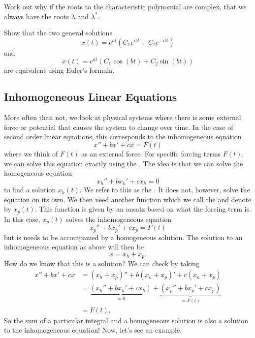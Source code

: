         \begin{exercise}
        Work out why if the roots to the characteristic polynomial are complex, that we always have the roots $\lambda$ and $\lambda^*$.
        \end{exercise}
        
        \begin{exercise}
        Show that the two general solutions
        \[
        x(t)=e^{at}(C_1 e^{ibt}+C_2e^{-ibt})
        \]
        and 
        \[
        x(t)=e^{at}(C_1 \cos(bt)+C_2\sin(bt))
        \]
        are equivalent using Euler's formula.
        \end{exercise}
        
        \subsection{Inhomogeneous Linear Equations}
        
        More often than not, we look at physical systems where there is some external force or potential that causes the system to change over time.  In the case of second order linear equations, this corresponds to the inhomogeneous equation
        \[
        x''+bx'+cx=F(t)
        \]
        where we think of $F(t)$ as an external force.  For specific forcing terms $F(t)$, we can solve this equation exactly using the .  The idea is that we can solve the homogeneous equation
        \[
        x_h''+bx_h'+cx_h=0
        \]
        to find a solution $x_h(t)$.  We refer to this as the . It does not, however, solve the equation on its own. We then need another function which we call the  and denote by $x_p(t)$. This function is given by an ansatz based on what the forcing term is.  In this case, $x_p(t)$ solves the inhomogeneous equation
        \[
        x_p''+bx_p'+cx_p=F(t)
        \]
        but is needs to be accompanied by a homogeneous solution. The solution to an inhomogeneous equation as above will then be
        \[
        x=x_h+x_p.
        \]
        How do we know that this is a solution? We can check by taking
        \begin{align*}
            x''+bx'+cx&=(x_h+x_p)''+b(x_h+x_p)'+c(x_h+x_p)\\
            &= \underbrace{(x_h''+bx_h'+cx_h)}_{=0}+\underbrace{(x_p''+bx_p'+cx_p)}_{=F(t)}\\
            &=F(t).
        \end{align*}
        So the sum of a particular integral and a homogeneous solution is also a solution to the inhomogeneous equation! Now, let's see an example.
        
